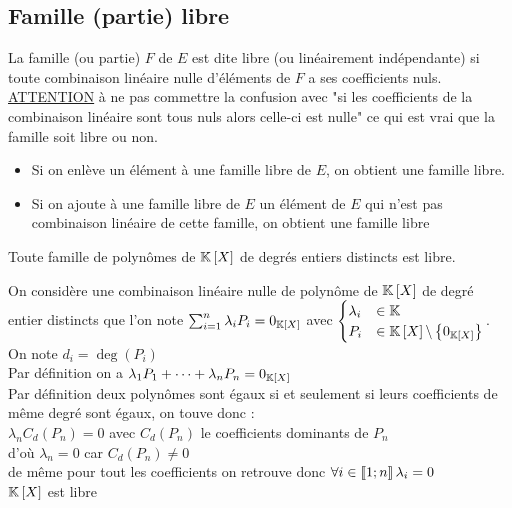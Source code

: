\subsection{Famille (partie) libre}
\begin{defi}
    La famille (ou partie) \(F\) de \(E\) est dite libre (ou linéairement indépendante) si toute combinaison linéaire nulle d’éléments de \(F\) a ses coefficients nuls.\\
    \underline{ATTENTION} à ne pas commettre la confusion avec "si les coefficients de la combinaison linéaire sont tous nuls alors celle-ci est nulle" ce qui est vrai que la famille soit libre ou non.
\end{defi}
\begin{prop}
    \begin{itemize}
        \item Si on enlève un élément à une famille libre de \(E\), on obtient une famille libre.
        \item Si on ajoute à une famille libre de \(E\) un élément de \(E\) qui n’est pas combinaison linéaire de cette famille, on obtient une famille libre
    \end{itemize}
\end{prop}
\begin{defprop}
    Toute famille de polynômes de \(\mathbb{K} \left[X\right]\) de degrés entiers distincts est libre.
\end{defprop}
\begin{dem}
    On considère une combinaison linéaire nulle de polynôme de \(\mathbb{K} \left[ X\right]\) de degré entier distincts que l'on note \(\sum_{i = 1}^n \lambda_i P_i = 0 _{\mathbb{K} \left[X\right]}\) avec 
    \(\begin{cases}
        \lambda_i &\in \mathbb{K} \\
        P_i &\in \mathbb{K} \left[X\right] \backslash \left\lbrace0_{\mathbb{K} \left[X\right]}\right\rbrace
    \end{cases}\).\\
    On note \(d_i = \deg(P_i)\)\\
    Par définition on a \(\lambda_1 P_1 + \dots + \lambda_n P_n = 0_{\mathbb{K} \left[X\right]}\)\\
    Par définition deux polynômes sont égaux si et seulement si leurs coefficients de même degré sont égaux, on touve donc  : \\
    \(\lambda_n C_d(P_n) = 0\) avec \(C_d(P_n)\) le coefficients dominants de \(P_n\)\\
    d'où \(\lambda_n = 0\) car \(C_d(P_n)\neq 0\)\\ de même pour tout les coefficients on retrouve donc \(\forall i \in \left\llbracket1;n\right\rrbracket\lambda_i = 0\) \\
    \conclusion\(\mathbb{K}\left[X\right]\) est libre

\end{dem}
